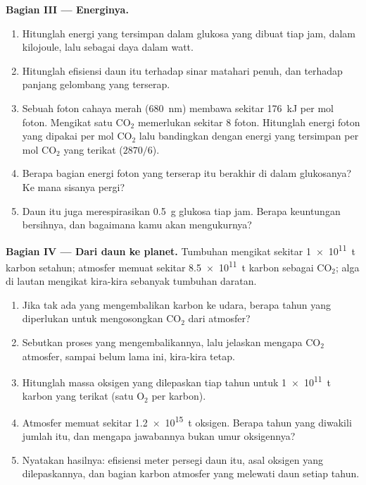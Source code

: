 \begin{problem}
\medskip
\noindent\textbf{Bagian III --- Energinya.}
\begin{enumerate}[resume]
  \item Hitunglah energi yang tersimpan dalam glukosa yang dibuat tiap
        jam, dalam kilojoule, lalu sebagai daya dalam watt.
  \item Hitunglah efisiensi daun itu terhadap sinar matahari penuh,
        dan terhadap panjang gelombang yang terserap.
  \item Sebuah foton cahaya merah (\qty{680}{nm}) membawa sekitar
        \qty{176}{kJ} per mol foton. Mengikat satu $\mathrm{CO_2}$
        memerlukan sekitar 8 foton. Hitunglah energi foton yang dipakai
        per mol $\mathrm{CO_2}$ lalu bandingkan dengan energi yang
        tersimpan per mol $\mathrm{CO_2}$ yang terikat ($2870/6$).
  \item Berapa bagian energi foton yang terserap itu berakhir di dalam
        glukosanya? Ke mana sisanya pergi?
  \item Daun itu juga merespirasikan \qty{0.5}{g} glukosa tiap jam.
        Berapa keuntungan bersihnya, dan bagaimana kamu akan
        mengukurnya?
\end{enumerate}

\medskip
\noindent\textbf{Bagian IV --- Dari daun ke planet.}
Tumbuhan mengikat sekitar \qty{1e11}{t} karbon setahun; atmosfer memuat
sekitar \qty{8.5e11}{t} karbon sebagai $\mathrm{CO_2}$; alga di
lautan mengikat kira-kira sebanyak tumbuhan daratan.
\begin{enumerate}[resume]
  \item Jika tak ada yang mengembalikan karbon ke udara, berapa tahun
        yang diperlukan  untuk mengosongkan
        $\mathrm{CO_2}$ dari atmosfer?
  \item Sebutkan proses yang mengembalikannya, lalu jelaskan mengapa
        $\mathrm{CO_2}$ atmosfer, sampai belum lama ini, kira-kira
        tetap.
  \item Hitunglah massa oksigen yang dilepaskan tiap tahun untuk
        \qty{1e11}{t} karbon yang terikat (satu $\mathrm{O_2}$ per
        karbon).
  \item Atmosfer memuat sekitar \qty{1.2e15}{t} oksigen. Berapa tahun
         yang diwakili jumlah itu, dan mengapa jawabannya
        bukan umur oksigennya?
  \item Nyatakan hasilnya: efisiensi meter persegi daun itu, asal
        oksigen yang dilepaskannya, dan bagian karbon atmosfer yang
        melewati daun setiap tahun.
\end{enumerate}
\end{problem}
